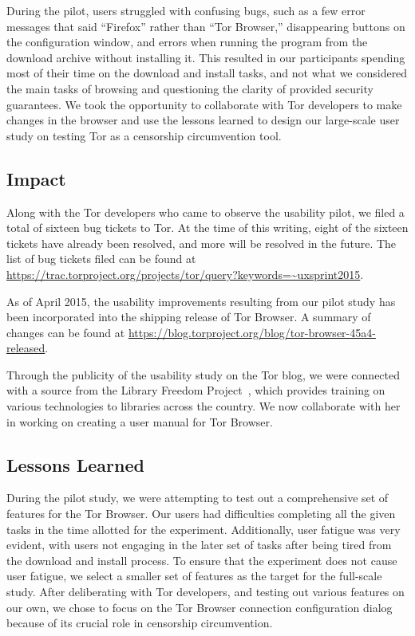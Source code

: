 \documentclass[letterpaper,twocolumn,11pt]{article}
\begin{document}
During the pilot, users struggled with confusing bugs, such as a few error messages that
said ``Firefox'' rather than ``Tor Browser,'' disappearing buttons on the configuration window, and errors when
running the program from the download archive without installing it.
This resulted in our
participants spending most of their time on the download and install tasks, and not
what we considered the main tasks of browsing and
questioning the clarity of provided security 
guarantees. We took the opportunity to collaborate with Tor developers to make changes in the
browser and use the lessons learned to design our large-scale user study on testing Tor as a 
censorship circumvention tool. 

\subsection{Impact}
\indent \indent Along with the Tor developers who came to observe the usability pilot, we filed 
a total of sixteen bug tickets to Tor. At the time of  this writing, eight of the sixteen tickets 
have already been resolved, and more will be resolved in the future.  The list of bug
tickets filed can be found at \url{https://trac.torproject.org/projects/tor/query?keywords=~uxsprint2015}. 

As of April 2015, the usability improvements resulting from our pilot study has been incorporated into the shipping
release of Tor Browser.
A summary of changes can be found at \url{https://blog.torproject.org/blog/tor-browser-45a4-released}. 

Through the publicity of the usability study on the Tor blog, we were connected
with a source from the Library Freedom Project~\cite{libraryfreedomproject}, which provides training on various technologies 
to libraries across the country. We now collaborate with her in working on creating a user manual
for Tor Browser. 

\subsection{Lessons Learned} 
\indent \indent During the pilot study, we were attempting to test out a comprehensive set of 
features for the Tor Browser. Our users had difficulties completing all the given tasks in the 
time allotted for the experiment. Additionally, user fatigue was very evident, with users not 
engaging in the later set of tasks after being tired from the download and install process. 
To ensure that the experiment does not cause user fatigue, we select a smaller set of features 
as the target for the full-scale study.  After deliberating with Tor developers, and testing out
various features on our own, we chose to focus on the Tor Browser connection configuration 
dialog because of its crucial role in censorship circumvention. 
\end{document}
